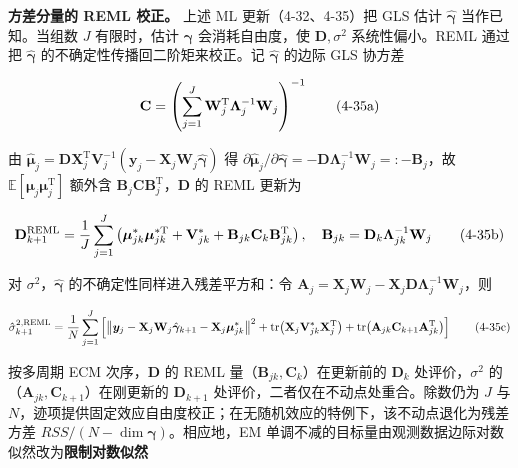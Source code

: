 \documentclass[12pt,a4paper]{ctexart}
\makeatletter
\numberwithin{figure}{section}
\numberwithin{table}{section}
\let\ltx@orig@tag\tag
\renewcommand{\tag}[1]{\refstepcounter{equation}\ltx@orig@tag{#1}}%
\makeatother
\begin{document}
\textbf{方差分量的 REML 校正。} 上述 ML 更新（4-32、4-35）把 GLS 估计 $\hat{\boldsymbol{\gamma}}$ 当作已知。当组数 $J$ 有限时，估计 $\boldsymbol{\gamma}$ 会消耗自由度，使 $\mathbf{D},\sigma^{2}$ 系统性偏小。REML 通过把 $\hat{\boldsymbol{\gamma}}$ 的不确定性传播回二阶矩来校正。记 $\hat{\boldsymbol{\gamma}}$ 的边际 GLS 协方差

\begin{equation}
\mathbf{C}=\left(\sum_{j=1}^{J}\mathbf{W}_{j}^{\mathrm{T}}\boldsymbol{\Lambda}_{j}^{-1}\mathbf{W}_{j}\right)^{-1} \tag{4-35a}
\end{equation}

由 $\hat{\boldsymbol{\mu}}_{j}=\mathbf{D}\mathbf{X}_{j}^{\mathrm{T}}\mathbf{V}_{j}^{-1}\left(\boldsymbol{y}_{j}-\mathbf{X}_{j}\mathbf{W}_{j}\hat{\boldsymbol{\gamma}}\right)$ 得 $\partial\hat{\boldsymbol{\mu}}_{j}/\partial\hat{\boldsymbol{\gamma}}=-\mathbf{D}\boldsymbol{\Lambda}_{j}^{-1}\mathbf{W}_{j}=:-\mathbf{B}_{j}$，故 $\mathbb{E}\!\left[\boldsymbol{\mu}_{j}\boldsymbol{\mu}_{j}^{\mathrm{T}}\right]$ 额外含 $\mathbf{B}_{j}\mathbf{C}\mathbf{B}_{j}^{\mathrm{T}}$，$\mathbf{D}$ 的 REML 更新为

\begin{equation}
\mathbf{D}_{k+1}^{\mathrm{REML}}=\frac{1}{J}\sum_{j=1}^{J}\left(\boldsymbol{\mu}_{jk}^{*}\boldsymbol{\mu}_{jk}^{*\mathrm{T}}+\mathbf{V}_{jk}^{*}+\mathbf{B}_{jk}\mathbf{C}_{k}\mathbf{B}_{jk}^{\mathrm{T}}\right),\quad \mathbf{B}_{jk}=\mathbf{D}_{k}\boldsymbol{\Lambda}_{jk}^{-1}\mathbf{W}_{j} \tag{4-35b}\label{eq:4-35b}
\end{equation}

对 $\sigma^{2}$，$\hat{\boldsymbol{\gamma}}$ 的不确定性同样进入残差平方和：令 $\mathbf{A}_{j}=\mathbf{X}_{j}\mathbf{W}_{j}-\mathbf{X}_{j}\mathbf{D}\boldsymbol{\Lambda}_{j}^{-1}\mathbf{W}_{j}$，则

\begin{equation}
\hat{\sigma}_{k+1}^{2,\mathrm{REML}}=\frac{1}{N}\sum_{j=1}^{J}\left[\left\|\boldsymbol{y}_{j}-\mathbf{X}_{j}\mathbf{W}_{j}\hat{\boldsymbol{\gamma}}_{k+1}-\mathbf{X}_{j}\boldsymbol{\mu}_{jk}^{*}\right\|^{2}+\operatorname{tr}\!\left(\mathbf{X}_{j}\mathbf{V}_{jk}^{*}\mathbf{X}_{j}^{\mathrm{T}}\right)+\operatorname{tr}\!\left(\mathbf{A}_{jk}\mathbf{C}_{k+1}\mathbf{A}_{jk}^{\mathrm{T}}\right)\right] \tag{4-35c}
\end{equation}

按多周期 ECM 次序，$\mathbf{D}$ 的 REML 量（$\mathbf{B}_{jk},\mathbf{C}_{k}$）在更新前的 $\mathbf{D}_{k}$ 处评价，$\sigma^{2}$ 的（$\mathbf{A}_{jk},\mathbf{C}_{k+1}$）在刚更新的 $\mathbf{D}_{k+1}$ 处评价，二者仅在不动点处重合。除数仍为 $J$ 与 $N$，迹项提供固定效应自由度校正；在无随机效应的特例下，该不动点退化为残差方差 $RSS/(N-\dim\boldsymbol{\gamma})$。相应地，EM 单调不减的目标量由观测数据边际对数似然改为\textbf{限制对数似然}
\end{document}
